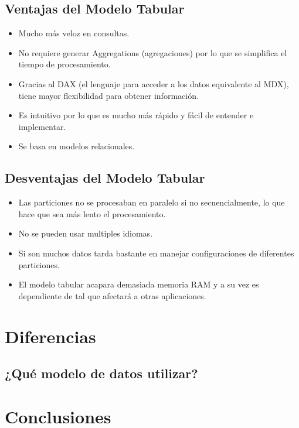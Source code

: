 \documentclass[preprint,12pt]{elsarticle}
\begin{document}
\subsection{Ventajas del Modelo Tabular}

\begin{itemize}
	\item Mucho más veloz en consultas.
	\item No requiere generar Aggregations (agregaciones) por lo que se simplifica el tiempo de procesamiento.
	\item Gracias al DAX (el lenguaje para acceder a los datos equivalente al MDX), tiene mayor flexibilidad para obtener información.
	\item Es intuitivo por lo que es mucho más rápido y fácil de entender e implementar.
	\item Se basa en modelos relacionales.
\end{itemize}

\subsection{Desventajas del Modelo Tabular}

\begin{itemize}
	\item Las particiones no se procesaban en paralelo si no secuencialmente, lo que hace que sea más lento el procesamiento.
	\item No se pueden usar multiples idiomas.
	\item Si son muchos datos tarda bastante en manejar configuraciones de diferentes particiones.
	\item El modelo tabular acapara demasiada memoria RAM y a su vez es dependiente de tal que afectará a otras aplicaciones.
\end{itemize}


\section{Diferencias}

\subsection{¿Qué modelo de datos utilizar? }

\section{Conclusiones}
\end{document}
